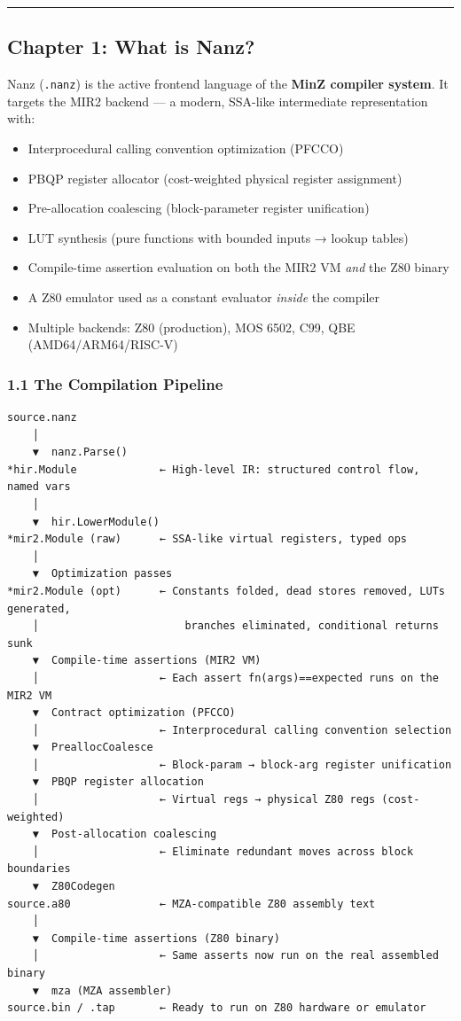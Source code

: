 \documentclass[
  11pt,
]{article}
\providecommand{\tightlist}{%
  \setlength{\itemsep}{0pt}\setlength{\parskip}{0pt}}
\begin{document}
\begin{center}\rule{0.5\linewidth}{0.5pt}\end{center}

\subsection{Chapter 1: What is Nanz?}\label{chapter-1-what-is-nanz}

Nanz (\texttt{.nanz}) is the active frontend language of the
\textbf{MinZ compiler system}. It targets the MIR2 backend --- a modern,
SSA-like intermediate representation with:

\begin{itemize}
\tightlist
\item
  Interprocedural calling convention optimization (PFCCO)
\item
  PBQP register allocator (cost-weighted physical register assignment)
\item
  Pre-allocation coalescing (block-parameter register unification)
\item
  LUT synthesis (pure functions with bounded inputs → lookup tables)
\item
  Compile-time assertion evaluation on both the MIR2 VM \emph{and} the
  Z80 binary
\item
  A Z80 emulator used as a constant evaluator \emph{inside} the compiler
\item
  Multiple backends: Z80 (production), MOS 6502, C99, QBE
  (AMD64/ARM64/RISC-V)
\end{itemize}

\subsubsection{1.1 The Compilation
Pipeline}\label{the-compilation-pipeline}

\begin{verbatim}
source.nanz
    │
    ▼  nanz.Parse()
*hir.Module             ← High-level IR: structured control flow, named vars
    │
    ▼  hir.LowerModule()
*mir2.Module (raw)      ← SSA-like virtual registers, typed ops
    │
    ▼  Optimization passes
*mir2.Module (opt)      ← Constants folded, dead stores removed, LUTs generated,
    │                       branches eliminated, conditional returns sunk
    ▼  Compile-time assertions (MIR2 VM)
    │                   ← Each assert fn(args)==expected runs on the MIR2 VM
    ▼  Contract optimization (PFCCO)
    │                   ← Interprocedural calling convention selection
    ▼  PreallocCoalesce
    │                   ← Block-param → block-arg register unification
    ▼  PBQP register allocation
    │                   ← Virtual regs → physical Z80 regs (cost-weighted)
    ▼  Post-allocation coalescing
    │                   ← Eliminate redundant moves across block boundaries
    ▼  Z80Codegen
source.a80              ← MZA-compatible Z80 assembly text
    │
    ▼  Compile-time assertions (Z80 binary)
    │                   ← Same asserts now run on the real assembled binary
    ▼  mza (MZA assembler)
source.bin / .tap       ← Ready to run on Z80 hardware or emulator
\end{verbatim}
\end{document}
